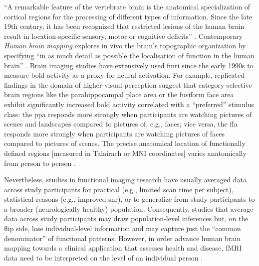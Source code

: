 



``A remarkable feature of the vertebrate brain is the anatomical specialization
of cortical regions for the processing of different types of information. Since
the late 19th century, it has been recognized that restricted lesions of the
human brain result in location-specific sensory, motor or cognitive deficits''
\citep{cohen1994localization}.
Contemporary \textit{Human brain mapping} \citep[e.g.,][]{raichle2009brief}
explores in vivo the brain's topographic organization
\citep[e.g.,][]{eickhoff2018topographic} by specifying ``in as much detail as
possible the localisation of function in the human brain''
\citep{savoy2001history}.
Brain imaging studies have extensively used \ac{fmri} since the early 1990s to
measure \ac{bold} activity as a proxy for neural activation.
For example, replicated findings in the domain of higher-visual perception
suggest that category-selective brain regions like the parahippocampal place
area \citep{epstein1998ppa, epstein1999parahippocampal} or the fusiform face
area \citep{kanwisher1997ffa, kanwisher2006fusiform} exhibit significantly
increased \ac{bold} activity correlated with a ``preferred'' stimulus class:
%
the \ac{ppa} responds more strongly when participants are watching pictures of
scenes and landscapes compared to pictures of, e.g., faces;
%
vice versa, the \ac{ffa} responds more strongly when participants are watching
pictures of faces compared to pictures of scenes.
%
The precise anatomical location of functionally defined regions [measured in
Talairach or MNI coordinates] varies anatomically from person to person
\citep{friston2006critique, saxe2006divide}.

%
Nevertheless, studies in functional imaging research have usually averaged data
across study participants for
%
practical (e.g., limited scan time per subject),
%
statistical reasons (e.g., improved \ac{snr}),
%
or to generalize from study participants to a broader (neurologically healthy)
population.
%
Consequently, studies that average data across study participants may draw
population-level inferences but, on the flip side, lose individual-level
information and may capture just the ``common denominator''
\citep{pinel2007fast} of functional patterns.
%
However, in order advance human brain mapping towards a clinical application
that assesses health and disease, fMRI data need to be interpreted on the level
of an individual person \citep{dubois2016building, wegrzyn2018thought}.



